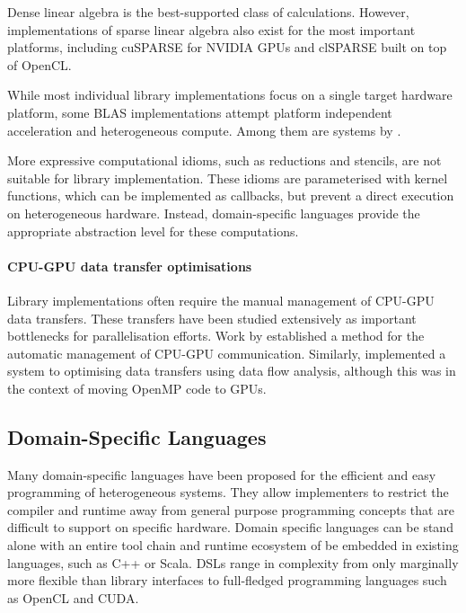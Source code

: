     Dense linear algebra is the best-supported class of calculations.
    However, implementations of sparse linear algebra also exist for
    the most important platforms, including cuSPARSE \cite{cusparse} for NVIDIA
    GPUs and clSPARSE \cite{clsparse} built on top of OpenCL.

    While most individual library implementations focus on a single target
    hardware platform, some BLAS implementations attempt platform independent
    acceleration and heterogeneous compute.
    Among them are systems by \citet{Wang:2016:BHP:2925426.2926256,
    10.1007/978-3-319-64203-1_33, Diego2017Multi}.

    More expressive computational idioms, such as reductions and stencils, are
    not suitable for library implementation.
    These idioms are parameterised with kernel functions, which can be
    implemented as callbacks, but prevent a direct execution on heterogeneous
    hardware.
    Instead, domain-specific languages provide the appropriate abstraction
    level for these computations.

    \paragraph*{CPU-GPU data transfer optimisations}
    Library implementations often require the manual management of CPU-GPU
    data transfers.
    These transfers have been studied extensively as important bottlenecks for
    parallelisation efforts.
    Work by \citet{Jablin:2011:ACC:1993316.1993516} established a
    method for the automatic management of CPU-GPU communication.
    Similarly, \citet{Lee:2009:OGC:1594835.1504194} implemented a system to
    optimising data transfers using data flow analysis, although this was in
    the context of moving OpenMP code to GPUs.

\subsection{Domain-Specific Languages}

    Many domain-specific languages have been proposed for the efficient and
    easy programming of heterogeneous systems.
    They allow implementers to restrict the compiler and runtime away from
    general purpose programming concepts that are difficult to support on
    specific hardware.
    Domain specific languages can be stand alone with an entire tool chain and
    runtime ecosystem of be embedded in existing languages, such as C++ or
    Scala.
    DSLs range in complexity from only marginally more flexible than library
    interfaces to full-fledged programming languages such as OpenCL and CUDA.

